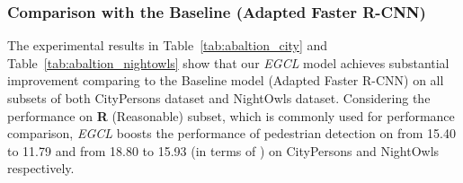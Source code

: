 \documentclass[journal]{IEEEtran}
\begin{document}
\begin{table}[!t]
\centering
\caption{Ablation study of our \emph{EGCL} model on NightOwls validation set in terms of  (lower is better). Baseline refers to Adapted Faster R-CNN. Note that the performance of Baseline model is achieved based on our implementation since no official results are reported. For all results, lower is better.}
\renewcommand\arraystretch{3} 
\label{tab:abaltion_nightowls}
\end{table}

\subsubsection{Comparison with the Baseline (Adapted Faster R-CNN)}
The experimental results in Table~\ref{tab:abaltion_city} and Table~\ref{tab:abaltion_nightowls} show that our \emph{EGCL} model achieves substantial improvement comparing to the Baseline model (Adapted Faster R-CNN) on all subsets of both CityPersons dataset and NightOwls dataset. Considering the performance on \textbf{R} (Reasonable) subset, which is commonly used for performance comparison, \emph{EGCL} boosts the performance of pedestrian detection on  from 15.40 to 11.79 and from 18.80 to 15.93 (in terms of ) on CityPersons and NightOwls respectively.
\end{document}
